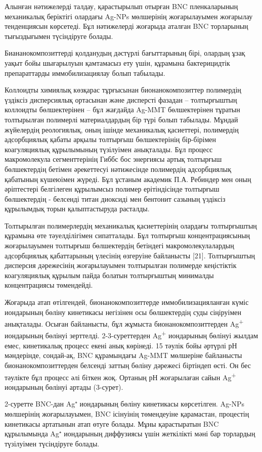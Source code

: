 \begin{multicols}{2}
Алынған нәтижелерді талдау, қарастырылып отырған BNC пленкаларының
механикалық беріктігі олардағы Ag-NPs мөлшерінің жоғарылауымен жоғарылау
тенденциясын көрсетеді. Бұл нәтижелерді жоғарыда аталған BNC торларының
тығыздығымен түсіндіруге болады.

Биананокомпозиттерді қолданудың дәстүрлі бағыттарының бірі, олардың ұзақ
уақыт бойы шығарылуын қамтамасыз ету үшін, құрамына бактерицидтік
препараттарды иммобилизациялау болып табылады.

Коллоидты химиялық көзқарас тұрғысынан бионанокомпозиттер полимердің
үздіксіз дисперсиялық ортасынан және дисперсті фазадан -- толтырғыштың
коллоидты бөлшектерінен -- бұл жағдайда Ag-MMT бөлшектерінен тұратын
толтырылған полимерлі материалдардың бір түрі болып табылады. Мұндай
жүйелердің реологиялық, оның ішінде механикалық қасиеттері, полимердің
адсорбциялық қабаты арқылы толтырғыш бөлшектерінің бір-бірімен
коагуляциялық құрылымының түзілуімен анықталады. Бұл процесс
макромолекула сегменттерінің Гиббс бос энергиясы артық толтырғыш
бөлшектердің бетімен әрекеттесуі нәтижесінде полимердің адсорбциялық
қабатының күшеюімен жүреді. Бұл ұстаным академик П.А. Ребиндер мен оның
әріптестері белгілеген құрылымсыз полимер ерітіндісінде толтырғыш
бөлшектердің - белсенді титан диоксиді мен бентонит сазының үздіксіз
құрылымдық торын қалыптастыруда расталды.

Толтырылған полимерлердің механикалық қасиеттерінің олардағы
толтырғыштың құрамына өте тәуелділігімен сипатталады. Бұл толтырғыш
концентрациясының жоғарылауымен толтырғыш бөлшектердің бетіндегі
макромолекулалардың адсорбциялық қабаттарының үлесінің өзгеруіне
байланысты {[}21{]}. Толтырғыштың дисперсия дәрежесінің жоғарылауымен
толтырылған полимерде кеңістіктік коагуляциялық құрылым пайда болатын
толтырғыштың минималды концентрациясы төмендейді.

Жоғарыда атап өтілгендей, бионанокомпозиттерде иммобилизацияланған күміс
иондарының бөліну кинетикасы негізінен осы бөлшектердің суды сіңіруімен
анықталады. Осыған байланысты, бұл жұмыста бионанокомпозиттерден
Ag\textsuperscript{+} иондарының бөлінуі зерттелді. 2-3-суреттерден
Ag\textsuperscript{+} иондарының бөлінуі жылдам емес, кинетикалық
процесс екені анық көрінеді. 15 тәулік бойы әртүрлі рН мәндерінде,
сондай-ақ, BNC құрамындағы Ag-MMT мөлшеріне байланысты
бионанокомпозиттерден белсенді заттың бөліну дәрежесі біртіндеп өсті. Он
бес тәулікте бұл процесс әлі біткен жоқ. Ортаның рН жоғарылаған сайын
Ag\textsuperscript{+} иондарының бөлінуі артады (3-сурет).

2-суретте BNC-дан Ag⁺ иондарының бөліну кинетикасы көрсетілген. Ag-NPs
мөлшерінің жоғарылауымен, BNC ісінуінің төмендеуіне қарамастан,
процестің кинетикасы артатынын атап өтуге болады. Мұны қарастыратын BNC
құрылымында Ag⁺ иондарының диффузиясы үшін жеткілікті мәні бар торлардың
түзілуімен түсіндіруге болады.
\end{multicols}


